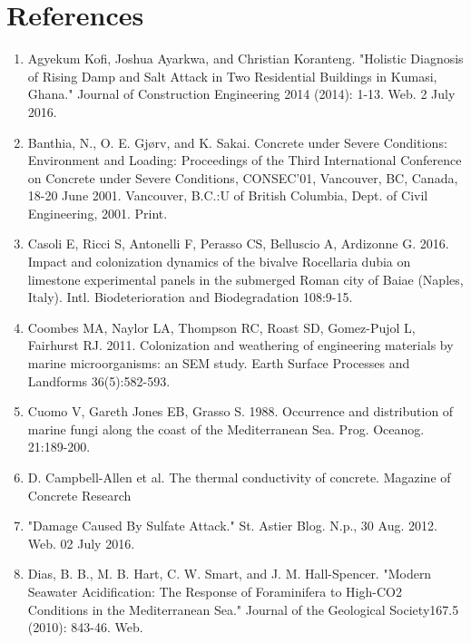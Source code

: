 \documentclass[12pt]{article}
\begin{document}
\section*{References}
\begin{enumerate}

\item Agyekum Kofi, Joshua Ayarkwa, and Christian Koranteng. "Holistic Diagnosis of Rising Damp and Salt Attack in Two 
Residential Buildings in Kumasi, Ghana." Journal of Construction Engineering 2014 (2014): 1-13. Web. 2 July 
2016.

\item Banthia, N., O. E. Gjørv, and K. Sakai. Concrete under Severe Conditions: Environment and Loading: Proceedings of the 
Third International Conference on Concrete under Severe Conditions, CONSEC'01, Vancouver, BC, Canada, 
18-20 June 2001. Vancouver, B.C.:U of British Columbia, Dept. of Civil Engineering, 2001. Print.

\item Casoli E, Ricci S, Antonelli F, Perasso CS, Belluscio A, Ardizonne G. 2016. Impact and colonization dynamics of the bivalve Rocellaria dubia on limestone experimental panels in the submerged Roman city of Baiae (Naples, Italy). Intl. Biodeterioration and Biodegradation 108:9-15. 

\item Coombes MA, Naylor LA, Thompson RC, Roast SD, Gomez-Pujol L, Fairhurst RJ. 2011. Colonization and weathering of engineering materials by marine microorganisms: an SEM study. Earth Surface Processes and Landforms 36(5):582-593.

\item Cuomo V, Gareth Jones EB, Grasso S. 1988. Occurrence and distribution of marine fungi along the coast of the Mediterranean Sea. Prog. Oceanog. 21:189-200.

\item D. Campbell-Allen et al. The thermal conductivity of concrete. Magazine of Concrete Research

\item "Damage Caused By Sulfate Attack." St. Astier Blog. N.p., 30 Aug. 2012. Web. 02 July 2016.

\item Dias, B. B., M. B. Hart, C. W. Smart, and J. M. Hall-Spencer. "Modern Seawater Acidification: The Response of 
Foraminifera to High-CO2 Conditions in the Mediterranean Sea." Journal of the Geological Society167.5 (2010): 
843-46. Web.


\end{enumerate}
\end{document}
